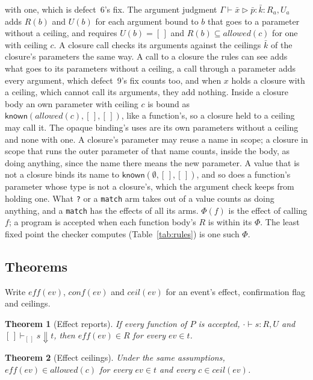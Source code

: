 \documentclass[11pt,a4paper]{article}
\newtheorem{theorem}{Theorem}
\newcommand{\allowed}{\mathit{allowed}}
\newcommand{\known}{\mathsf{known}}
\newcommand{\nsl}[1]{\texttt{#1}}
\begin{document}
with one, which is defect~6's fix. The argument judgment
$\Gamma \vdash \bar{x} \triangleright \bar{p}{:}\bar{k} : R_a, U_a$ adds
$R(b)$ and $U(b)$ for each argument bound to $b$ that goes to a parameter
without a ceiling, and requires $U(b) = [\,]$ and
$R(b) \subseteq \allowed(c)$ for one with ceiling $c$. A closure call
checks its arguments against the ceilings $\bar{k}$ of the closure's
parameters the same way. A call to a closure the rules can see adds what
goes to its parameters without a ceiling, a call through a parameter adds
every argument, which defect~9's fix counts too, and when $x$ holds a
closure with a ceiling, which cannot call its arguments, they add
nothing. Inside a closure body an own parameter with ceiling $c$ is
bound as $\known(\allowed(c), [\,], [\,])$, like a function's, so a
closure held to a ceiling may call it. The opaque binding's uses are its
own parameters without a ceiling and none with one. A closure's
parameter may reuse a name in scope; a closure in scope that runs the
outer parameter of that name counts, inside the body, as doing anything,
since the name there means the new parameter. A value that is not a
closure binds its name to $\known(\emptyset, [\,], [\,])$, and so does a
function's parameter whose type is not a closure's, which the argument
check keeps from holding one. What \nsl{?} or a \nsl{match} arm takes
out of a value counts as doing anything, and a \nsl{match} has the
effects of all its arms. $\Phi(f)$ is the
effect of calling $f$; a program is accepted when each function body's
$R$ is within its $\Phi$. The least fixed point the checker computes
(Table~\ref{tab:rules}) is one such $\Phi$.

\subsection{Theorems}

Write $\mathit{eff}(ev)$, $\mathit{conf}(ev)$ and $\mathit{ceil}(ev)$ for
an event's effect, confirmation flag and ceilings.

\begin{theorem}[Effect reports]
If every function of $P$ is accepted, $\cdot \vdash s : R, U$ and
$[\,] \vdash_{[\,]} s \Downarrow t$, then $\mathit{eff}(ev) \in R$ for
every $ev \in t$.
\end{theorem}

\begin{theorem}[Effect ceilings]
Under the same assumptions, $\mathit{eff}(ev) \in \allowed(c)$ for every
$ev \in t$ and every $c \in \mathit{ceil}(ev)$.
\end{theorem}
\end{document}
